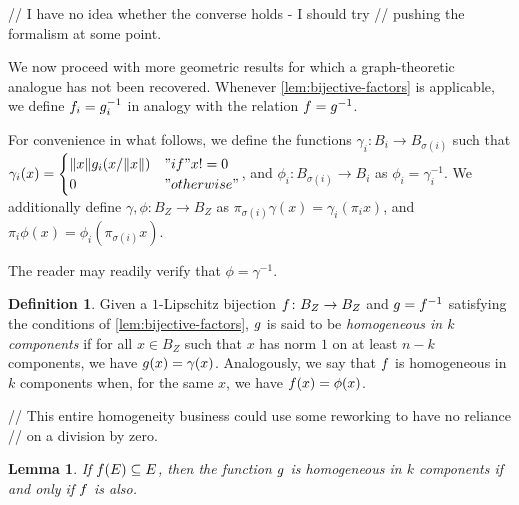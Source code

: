 \documentclass{amsart}
\newtheorem{lemma}{Lemma}
\theoremstyle{definition}
\newtheorem{definition}{Definition}
\begin{document}
  // I have no idea whether the converse holds - I should try
  // pushing the formalism at some point.

We now proceed with more geometric results for which a graph-theoretic analogue has not been recovered. Whenever \autoref{lem:bijective-factors} is applicable, we define $f_i = g_i^{-1}$ in analogy with the relation $f = g^{-1}$.

For convenience in what follows, we define the functions $\gamma_i  \colon B_i \to B_{\sigma(i)}$ such that
$\gamma_i (x) =
\begin{cases}\norm{x} g_i (x/\norm{x}) &"if" x != 0\\ 0 &"otherwise"\end{cases}$, and $\phi_i \colon B_{\sigma(i)} \to B_i$ as $\phi_i = \gamma_i^{-1}$. We additionally define
$\gamma, \phi \colon B_Z \to B_Z$ as $\pi_{\sigma(i)} \gamma(x) = \gamma_i (\pi_i x)$, and
$\pi_i \phi(x) = \phi_i (\pi_{\sigma(i)} x)$.

The reader may readily verify that $\phi = \gamma^{-1}$.

\begin{definition} 

  Given a $1$-Lipschitz bijection $f \colon B_Z \to B_Z$ and $g = f^{-1}$ satisfying the conditions of \autoref{lem:bijective-factors}, $g$ is said to be \textit{homogeneous in $k$ components} if for all $x \in B_Z$ such that $x$ has norm $1$ on at least $n-k$ components, we have $g(x) = \gamma(x)$. Analogously, we say that $f$ is homogeneous in $k$ components when, for the same $x$, we have $f(x) = \phi(x)$.
\end{definition}

// This entire homogeneity business could use some reworking to have no reliance
// on a division by zero.
\begin{lemma} \label{lem:homogeneity-equiv}
\annotation
  If $f(E) \subseteq E$, then
  the function $g$ is homogeneous in $k$ components if and only if
  $f$ is also.
\end{lemma}
\end{document}

